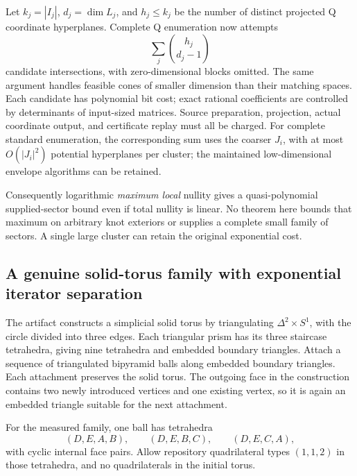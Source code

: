 Let $k_j=|I_j|$, $d_j=\dim L_j$, and $h_j\leq k_j$ be the number of distinct
projected Q coordinate hyperplanes.  Complete Q enumeration now attempts
\begin{equation}
\label{sec:sector-block-cost}
                         \sum_j\binom{h_j}{d_j-1}
\end{equation}
candidate intersections, with zero-dimensional blocks omitted.  The same
argument handles feasible cones of smaller dimension than their matching
spaces.  Each candidate has polynomial bit cost; exact rational coefficients
are controlled by determinants of input-sized matrices.  Source preparation,
projection, actual coordinate output, and certificate replay must all be
charged.  For complete standard enumeration, the corresponding sum uses
the coarser $J_i$, with at most $O(|J_i|^2)$ potential hyperplanes per
cluster; the maintained low-dimensional envelope algorithms can be retained.

Consequently logarithmic \emph{maximum local} nullity gives a
quasi-polynomial supplied-sector bound even if total nullity is linear.
No theorem here bounds that maximum on arbitrary knot exteriors or supplies
a complete small family of sectors.  A single large cluster can retain the
original exponential cost.

\subsection{A genuine solid-torus family with exponential iterator separation}

The artifact constructs a simplicial solid torus by triangulating
$\Delta^2\times S^1$, with the circle divided into three edges.  Each
triangular prism has its three staircase tetrahedra, giving nine tetrahedra
and embedded boundary triangles.  Attach a sequence of triangulated
bipyramid balls along embedded boundary triangles.  Each attachment
preserves the solid torus.  The outgoing face in the construction contains
two newly introduced vertices and one existing vertex, so it is again an
embedded triangle suitable for the next attachment.

For the measured family, one ball has tetrahedra
\[
 (D,E,A,B),\qquad(D,E,B,C),\qquad(D,E,C,A),
\]
with cyclic internal face pairs.  Allow repository quadrilateral types
$(1,1,2)$ in those tetrahedra, and no quadrilaterals in the initial torus.

